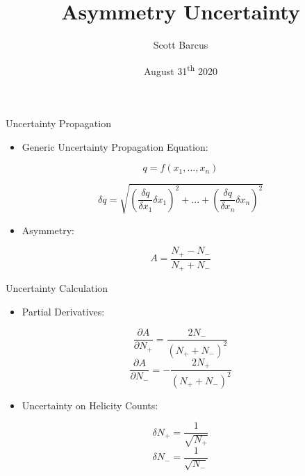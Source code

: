 \documentclass[10pt]{beamer}
\title{Asymmetry Uncertainty}
\subtitle{}
\date{August 31\textsuperscript{th} 2020}
\author{Scott Barcus}
\institute{Jefferson Lab}
\begin{document}
\maketitle

\begin{frame}{Uncertainty Propagation}

	\begin{itemize}
		\item Generic Uncertainty Propagation Equation:
	\end{itemize}

	\begin{equation}
		q=f(x_1,...,x_n)
	\end{equation}
	
	\begin{equation}
		\delta q = \sqrt{\left( \frac{\delta q}{\delta x_1}\delta x_1 \right)^2 +...+\left( \frac{\delta q}{\delta x_n}\delta x_n \right)^2}
	\end{equation}
	
	\begin{itemize}
		\item Asymmetry:
	\end{itemize}
	
	\begin{equation}
		A=\frac{N_+-N_-}{N_++N_-}
	\end{equation}

\end{frame}

\begin{frame}{Uncertainty Calculation}

	\begin{itemize}
		\item Partial Derivatives:
	\end{itemize}
	
	\begin{equation}
		\frac{\partial A}{\partial N_+}=\frac{2N_-}{\left( N_++N_- \right)^2}
	\end{equation}
	\begin{equation}
		\frac{\partial A}{\partial N_-}=-\frac{2N_+}{\left( N_++N_- \right)^2}
	\end{equation}
	
	\begin{itemize}
		\item Uncertainty on Helicity Counts:
	\end{itemize}
	
	\begin{equation}
		\delta N_+ = \frac{1}{\sqrt{N_+}}
	\end{equation}
	\begin{equation}
		\delta N_- = \frac{1}{\sqrt{N_-}}
	\end{equation}

\end{frame}
\end{document}
